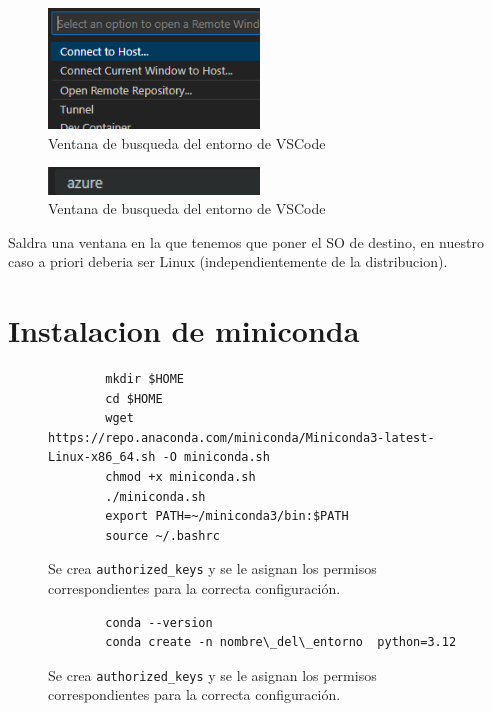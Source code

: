 \begin{figure}[h!]
    \centering
    \includegraphics[width=0.5\textwidth]{imagenes/connect_to_host_vscode.png}
    \caption[Ventana de busqueda del entorno de VSCode]{Ventana de busqueda del entorno de VSCode}
\end{figure}

\begin{figure}[h!]
    \centering
    \includegraphics[width=0.5\textwidth]{imagenes/azure.png}
    \caption[Ventana de busqueda del entorno de VSCode]{Ventana de busqueda del entorno de VSCode}
\end{figure}

Saldra una ventana en la que tenemos que poner el SO de destino, en nuestro caso a priori deberia ser Linux (independientemente de la distribucion).

\newpage
\section{Instalacion de miniconda}

\begin{figure}[h!]
    \centering
    \begin{verbatim}
        mkdir $HOME
        cd $HOME
        wget https://repo.anaconda.com/miniconda/Miniconda3-latest-Linux-x86_64.sh -O miniconda.sh
        chmod +x miniconda.sh
        ./miniconda.sh
        export PATH=~/miniconda3/bin:$PATH
        source ~/.bashrc
    \end{verbatim}
    \caption{Se crea \texttt{authorized\_keys} y se le asignan los permisos correspondientes para la correcta configuración.}
    \label{fig:creamos_authorized_keys}
\end{figure}

\begin{figure}[h!]
    \centering
    \begin{verbatim}
        conda --version
        conda create -n nombre\_del\_entorno  python=3.12
    \end{verbatim}
    \caption{Se crea \texttt{authorized\_keys} y se le asignan los permisos correspondientes para la correcta configuración.}
    \label{fig:creamos_authorized_keys}
\end{figure}